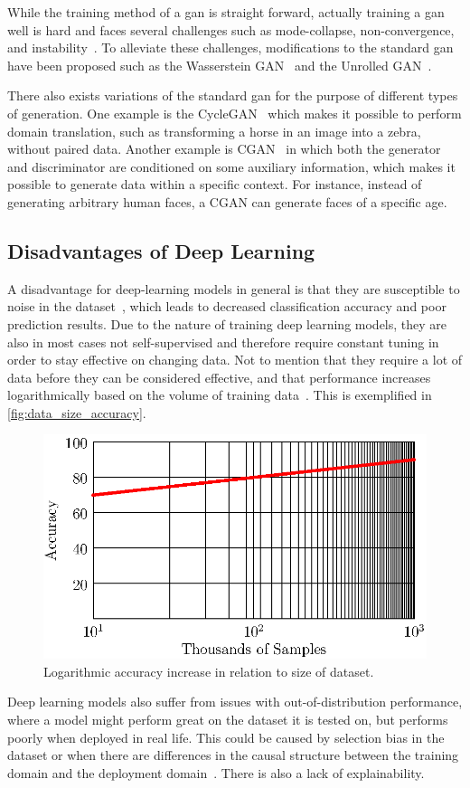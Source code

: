 While the training method of a \gls*{gan} is straight forward, actually training a \gls*{gan} well is hard and faces several challenges such as mode-collapse, non-convergence, and instability~\cite{gan_challenges,gan_challenges2}. To alleviate these challenges, modifications to the standard \gls*{gan} have been proposed such as the Wasserstein GAN~\cite{wgan} and the Unrolled GAN~\cite{unrolled_gan}.
\par
There also exists variations of the standard \gls*{gan} for the purpose of different types of generation. One example is the CycleGAN~\cite{CycleGAN} which makes it possible to perform domain translation, such as transforming a horse in an image into a zebra, without paired data. Another example is CGAN~\cite{cgan}  in which both the generator and discriminator are conditioned on some auxiliary information, which makes it possible to generate data within a specific context. For instance, instead of generating arbitrary human faces, a CGAN can generate faces of a specific age.
\subsection{Disadvantages of Deep Learning}
A disadvantage for deep-learning models in general is that they are susceptible to noise in the dataset~\cite{noise1,noise2}, which leads to decreased classification accuracy and poor prediction results. Due to the nature of training deep learning models, they are also in most cases not self-supervised and therefore require constant tuning in order to stay effective on changing data. Not to mention that they require a lot of data before they can be considered effective, and that performance increases logarithmically based on the volume of training data~\cite{deeplearning_dataset}. This is exemplified in \autoref{fig:data_size_accuracy}.
\begin{figure}[H]
    \centering
    \includegraphics[width=0.8\linewidth]{resources/related_works/training_volume}
    \caption[Dataset Volume Accuracy]{Logarithmic accuracy increase in relation to size of dataset.}
    \label{fig:data_size_accuracy}
\end{figure}
Deep learning models also suffer from issues with out-of-distribution performance, where a model might perform great on the dataset it is tested on, but performs poorly when deployed in real life. This could be caused by selection bias in the dataset or when there are differences in the causal structure between the training domain and the deployment domain~\cite{deeplearning_ood}. There is also a lack of explainability.
